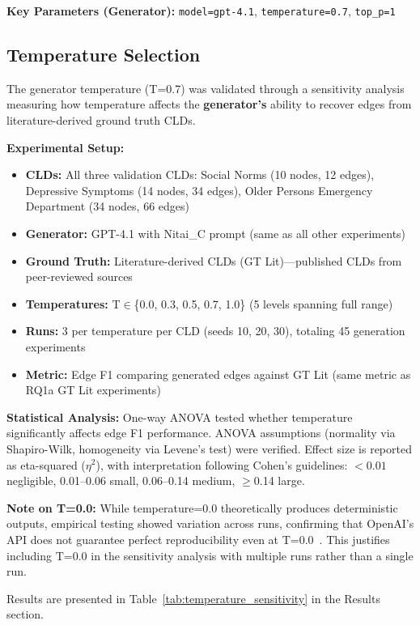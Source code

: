 \textbf{Key Parameters (Generator):} \texttt{model=gpt-4.1}, \texttt{temperature=0.7}, \texttt{top\_p=1}

\subsection{Temperature Selection}

The generator temperature (T=0.7) was validated through a sensitivity analysis measuring how temperature affects the \textbf{generator's} ability to recover edges from literature-derived ground truth CLDs.

\textbf{Experimental Setup:}
\begin{itemize}[noitemsep]
    \item \textbf{CLDs:} All three validation CLDs: Social Norms (10 nodes, 12 edges), Depressive Symptoms (14 nodes, 34 edges), Older Persons Emergency Department (34 nodes, 66 edges)
    \item \textbf{Generator:} GPT-4.1 with Nitai\_C prompt (same as all other experiments)
    \item \textbf{Ground Truth:} Literature-derived CLDs (GT Lit)---published CLDs from peer-reviewed sources
    \item \textbf{Temperatures:} T$\in$\{0.0, 0.3, 0.5, 0.7, 1.0\} (5 levels spanning full range)
    \item \textbf{Runs:} 3 per temperature per CLD (seeds 10, 20, 30), totaling 45 generation experiments
    \item \textbf{Metric:} Edge F1 comparing generated edges against GT Lit (same metric as RQ1a GT Lit experiments)
\end{itemize}

\textbf{Statistical Analysis:} One-way ANOVA tested whether temperature significantly affects edge F1 performance. ANOVA assumptions (normality via Shapiro-Wilk, homogeneity via Levene's test) were verified. Effect size is reported as eta-squared ($\eta^2$), with interpretation following Cohen's guidelines: $<0.01$ negligible, 0.01--0.06 small, 0.06--0.14 medium, $\geq$0.14 large.

\textbf{Note on T=0.0:} While temperature=0.0 theoretically produces deterministic outputs, empirical testing showed variation across runs, confirming that OpenAI's API does not guarantee perfect reproducibility even at T=0.0~\cite{openai2024api}. This justifies including T=0.0 in the sensitivity analysis with multiple runs rather than a single run.

Results are presented in Table~\ref{tab:temperature_sensitivity} in the Results section.

